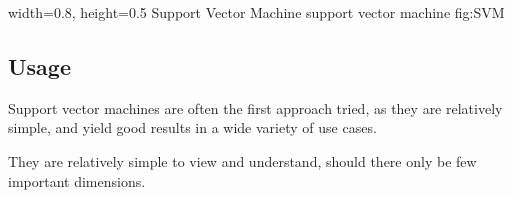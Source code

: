     {width=0.8\textwidth, height=0.5\textheight} %
    {Support Vector Machine}   %
    {support vector machine}   %
    {fig:SVM}    %

\subsection{Usage}
Support vector machines are often the first approach tried, as they are relatively simple, and yield good results in a wide variety of use cases. 

They are relatively simple to view and understand, should there only be few important dimensions.